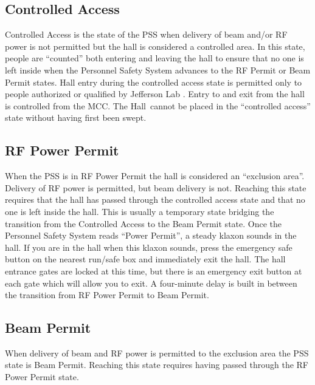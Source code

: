 \begin{safetyen}{10}{10}
\subsection{Controlled Access}
\end{safetyen}

 Controlled Access is the state of the PSS when delivery of beam
and/or RF power is not permitted but the hall is considered a
controlled area.  In this state, people are ``counted'' both entering
and leaving the hall to ensure that no one is left inside when the
Personnel Safety System advances to the RF Permit or Beam Permit
states.  Hall entry during the controlled access state is permitted
only to people authorized or qualified by Jefferson Lab .  Entry to
and exit from the hall is controlled from the MCC.  The Hall~cannot be
placed in the ``controlled access'' state without having first been
swept.

\begin{safetyen}{10}{10}
\subsection{RF Power Permit} 
\end{safetyen}

When the PSS is in RF Power Permit the hall is considered an
``exclusion area''.  Delivery of RF power is permitted, but beam
delivery is not.  Reaching this state requires that the hall has
passed through the controlled access state and that no one is left
inside the hall. This is usually a temporary state bridging the
transition from the Controlled Access to the Beam Permit state. Once
the Personnel Safety System reads ``Power Permit'', a steady klaxon
sounds in the hall. If you are in the hall when this klaxon sounds,
press the emergency safe button on the nearest run/safe box and
immediately exit the hall. The hall entrance gates are locked at this
time, but there is an emergency exit button at each gate which will
allow you to exit. A four-minute delay is built in between the
transition from RF Power Permit to Beam Permit.
 
\begin{safetyen}{10}{10}
\subsection{Beam Permit}
\end{safetyen}

 When delivery of beam and RF power is permitted to the exclusion area
the PSS state is Beam Permit.  Reaching this state requires having
passed through the RF Power Permit state.


